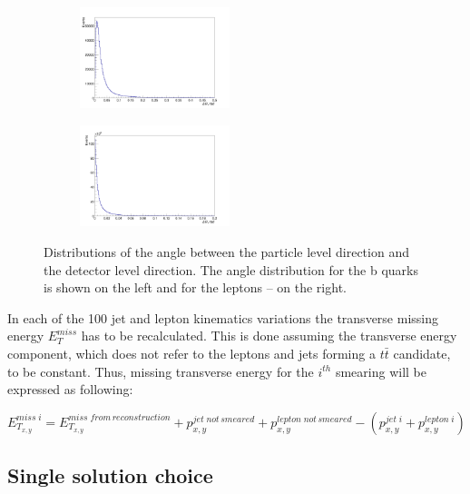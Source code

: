 \begin{figure}[t]
\centering
\begin{subfigure}
  \centering
  \includegraphics[width=0.48\textwidth]{05_kinReco/plots/dan_jet.png}
\end{subfigure}
\begin{subfigure}
  \centering
  \includegraphics[width=0.48\textwidth]{05_kinReco/plots/dan_lep.png}
\end{subfigure}
\caption{Distributions of the angle between the particle level direction and the detector level direction.
The angle distribution for the b quarks is shown on the left and for the leptons -- on the right.}
\label{fig:dAngle}
\end{figure}

In each of the 100 jet and lepton kinematics variations the transverse missing energy $E_{T}^{miss}$ has to be recalculated. This is done
assuming the transverse energy component, which does not refer to the leptons and jets forming a $t\bar{t}$ candidate, to be constant. Thus,
missing transverse energy for the $i^{th}$ smearing will be expressed as following:

\begin{equation}
 E^{miss\;i}_{T_{x,y}} = E^{miss \; from \, reconstruction}_{T_{x,y}} + p^{jet \; not\,smeared}_{x,y} + p^{lepton\;not\,smeared}_{x,y} - (p^{jet\;i}_{x,y} + p^{lepton\;i}_{x,y})
\end{equation}

\subsection{Single solution choice}

